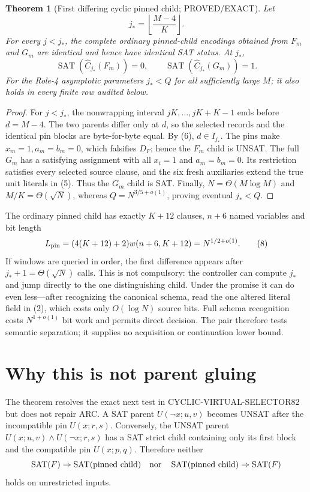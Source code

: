 \documentclass[11pt]{article}
\newtheorem{theorem}{Theorem}
\newcommand{\SAT}{\operatorname{SAT}}
\begin{document}
\begin{theorem}[First differing cyclic pinned child; PROVED/EXACT]
Let
\[
 j_*=\left\lfloor\frac{M-4}{K}\right\rfloor.
\tag{6}
\]
For every $j<j_*$, the complete ordinary pinned-child encodings obtained
from $F_m$ and $G_m$ are identical and hence have identical SAT status.  At
$j_*$,
\[
 \SAT(\widehat C_{j_*}(F_m))=0,
 \qquad
 \SAT(\widehat C_{j_*}(G_m))=1.
\tag{7}
\]
For the Role-4 asymptotic parameters $j_*<Q$ for all sufficiently large
$M$; it also holds in every finite row audited below.
\end{theorem}
\begin{proof}
For $j<j_*$, the nonwrapping interval $jK,\ldots,jK+K-1$ ends before
$d=M-4$.  The two parents differ only at $d$, so the selected records and
the identical pin blocks are byte-for-byte equal.  By (6), $d\in I_{j_*}$.
The pins make $x_m=1,a_m=b_m=0$, which falsifies $D_F$; hence the $F_m$
child is UNSAT.  The full $G_m$ has a satisfying assignment with all
$x_i=1$ and $a_m=b_m=0$.  Its restriction satisfies every selected source
clause, and the six fresh auxiliaries extend the true unit literals in (5).
Thus the $G_m$ child is SAT.  Finally, $N=\Theta(M\log M)$ and
$M/K=\Theta(\sqrt N)$, whereas $Q=N^{3/5+o(1)}$, proving eventual
$j_*<Q$.
\end{proof}

The ordinary pinned child has exactly $K+12$ clauses, $n+6$ named
variables and bit length
\[
 L_{\rm pin}=(4(K+12)+2)w(n+6,K+12)=N^{1/2+o(1)}.
\tag{8}
\]
If windows are queried in order, the first difference appears after
$j_*+1=\Theta(\sqrt N)$ calls.  This is not compulsory: the controller can
compute $j_*$ and jump directly to the one distinguishing child.  Under the
promise it can do even less---after recognizing the canonical schema, read
the one altered literal field in (2), which costs only $O(\log N)$ source
bits.  Full schema recognition costs $N^{1+o(1)}$ bit work and permits direct
decision.  The pair therefore tests semantic separation; it supplies no
acquisition or continuation lower bound.

\section{Why this is not parent gluing}
The theorem resolves the exact next test in CYCLIC-VIRTUAL-SELECTOR82 but
does not repair ARC.  A SAT parent $U(\neg x;u,v)$ becomes UNSAT after the
incompatible pin $U(x;r,s)$.  Conversely, the UNSAT parent
$U(x;u,v)\wedge U(\neg x;r,s)$ has a SAT strict child containing only its
first block and the compatible pin $U(x;p,q)$.  Therefore neither
\[
 \SAT(F)\Rightarrow\SAT(\text{pinned child})
 \quad\hbox{nor}\quad
 \SAT(\text{pinned child})\Rightarrow\SAT(F)
\]
holds on unrestricted inputs.
\end{document}
